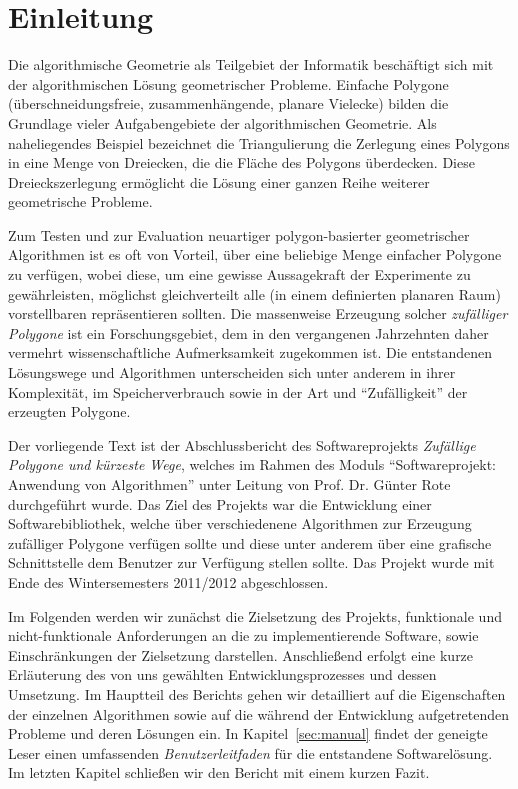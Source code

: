 \section{Einleitung}
Die algorithmische Geometrie als Teilgebiet der Informatik beschäftigt sich mit der algorithmischen Lösung geometrischer Probleme. Einfache Polygone (überschneidungsfreie, zusammenhängende, planare Vielecke) bilden die Grundlage vieler Aufgabengebiete der algorithmischen Geometrie. Als naheliegendes Beispiel bezeichnet die Triangulierung die Zerlegung eines Polygons in eine Menge von Dreiecken, die die Fläche des Polygons überdecken. Diese Dreieckszerlegung ermöglicht die Lösung einer ganzen Reihe weiterer geometrische Probleme.

Zum Testen und zur Evaluation neuartiger polygon-basierter geometrischer Algorithmen ist es oft von Vorteil, über eine beliebige Menge einfacher Polygone zu verfügen, wobei diese, um eine gewisse Aussagekraft der Experimente zu gewährleisten, möglichst gleichverteilt alle (in einem definierten planaren Raum) vorstellbaren repräsentieren sollten. Die massenweise Erzeugung solcher \emph{zufälliger Polygone} ist ein Forschungsgebiet, dem in den vergangenen Jahrzehnten daher vermehrt wissenschaftliche Aufmerksamkeit zugekommen ist. Die entstandenen Lösungswege und Algorithmen unterscheiden sich unter anderem in ihrer Komplexität, im Speicherverbrauch sowie in der Art und \enquote{Zufälligkeit} der erzeugten Polygone.

Der vorliegende Text ist der Abschlussbericht des Softwareprojekts \emph{Zufällige Polygone und kürzeste Wege}, welches im Rahmen des Moduls \enquote{Softwareprojekt: Anwendung von Algorithmen} unter Leitung von Prof. Dr. Günter Rote durchgeführt wurde. Das Ziel des Projekts war die Entwicklung einer Softwarebibliothek, welche über verschiedenene Algorithmen zur Erzeugung zufälliger Polygone verfügen sollte und diese unter anderem über eine grafische Schnittstelle dem Benutzer zur Verfügung stellen sollte. Das Projekt wurde mit Ende des Wintersemesters 2011/2012 abgeschlossen.

Im Folgenden werden wir zunächst die Zielsetzung des Projekts, funktionale und nicht-funktionale Anforderungen an die zu implementierende Software, sowie Einschränkungen der Zielsetzung darstellen. Anschließend erfolgt eine kurze Erläuterung des von uns gewählten Entwicklungsprozesses und dessen Umsetzung. Im Hauptteil des Berichts gehen wir detailliert auf die Eigenschaften der einzelnen Algorithmen sowie auf die während der Entwicklung aufgetretenden Probleme und deren Lösungen ein. In Kapitel~\ref{sec:manual} findet der geneigte Leser einen umfassenden \emph{Benutzerleitfaden} für die entstandene Softwarelösung. Im letzten Kapitel schließen wir den Bericht mit einem kurzen Fazit.
